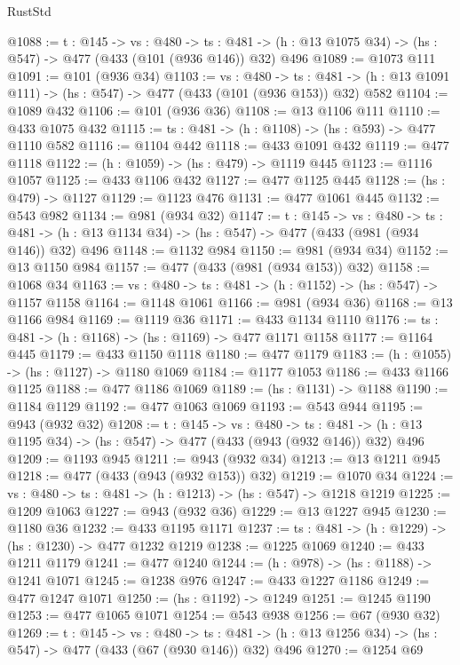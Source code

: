 \begin{lexlean}{RustStd}
\begin{coremodule}
@1088 := {t : @145} ->
  {vs : @480} ->
  {ts : @481} -> (h : @13 @1075 @34) -> (hs : @547) -> @477 (@433 (@101 (@936 @146)) @32) @496
@1089 := @1073 @111
@1091 := @101 (@936 @34)
@1103 := {vs : @480} ->
  {ts : @481} -> (h : @13 @1091 @111) -> (hs : @547) -> @477 (@433 (@101 (@936 @153)) @32) @582
@1104 := @1089 @432
@1106 := @101 (@936 @36)
@1108 := @13 @1106 @111
@1110 := @433 @1075 @432
@1115 := {ts : @481} -> (h : @1108) -> (hs : @593) -> @477 @1110 @582
@1116 := @1104 @442
@1118 := @433 @1091 @432
@1119 := @477 @1118
@1122 := (h : @1059) -> (hs : @479) -> @1119 @445
@1123 := @1116 @1057
@1125 := @433 @1106 @432
@1127 := @477 @1125 @445
@1128 := (hs : @479) -> @1127
@1129 := @1123 @476
@1131 := @477 @1061 @445
@1132 := @543 @982
@1134 := @981 (@934 @32)
@1147 := {t : @145} ->
  {vs : @480} ->
  {ts : @481} -> (h : @13 @1134 @34) -> (hs : @547) -> @477 (@433 (@981 (@934 @146)) @32) @496
@1148 := @1132 @984
@1150 := @981 (@934 @34)
@1152 := @13 @1150 @984
@1157 := @477 (@433 (@981 (@934 @153)) @32)
@1158 := @1068 @34
@1163 := {vs : @480} -> {ts : @481} -> (h : @1152) -> (hs : @547) -> @1157 @1158
@1164 := @1148 @1061
@1166 := @981 (@934 @36)
@1168 := @13 @1166 @984
@1169 := @1119 @36
@1171 := @433 @1134 @1110
@1176 := {ts : @481} -> (h : @1168) -> (hs : @1169) -> @477 @1171 @1158
@1177 := @1164 @445
@1179 := @433 @1150 @1118
@1180 := @477 @1179
@1183 := (h : @1055) -> (hs : @1127) -> @1180 @1069
@1184 := @1177 @1053
@1186 := @433 @1166 @1125
@1188 := @477 @1186 @1069
@1189 := (hs : @1131) -> @1188
@1190 := @1184 @1129
@1192 := @477 @1063 @1069
@1193 := @543 @944
@1195 := @943 (@932 @32)
@1208 := {t : @145} ->
  {vs : @480} ->
  {ts : @481} -> (h : @13 @1195 @34) -> (hs : @547) -> @477 (@433 (@943 (@932 @146)) @32) @496
@1209 := @1193 @945
@1211 := @943 (@932 @34)
@1213 := @13 @1211 @945
@1218 := @477 (@433 (@943 (@932 @153)) @32)
@1219 := @1070 @34
@1224 := {vs : @480} -> {ts : @481} -> (h : @1213) -> (hs : @547) -> @1218 @1219
@1225 := @1209 @1063
@1227 := @943 (@932 @36)
@1229 := @13 @1227 @945
@1230 := @1180 @36
@1232 := @433 @1195 @1171
@1237 := {ts : @481} -> (h : @1229) -> (hs : @1230) -> @477 @1232 @1219
@1238 := @1225 @1069
@1240 := @433 @1211 @1179
@1241 := @477 @1240
@1244 := (h : @978) -> (hs : @1188) -> @1241 @1071
@1245 := @1238 @976
@1247 := @433 @1227 @1186
@1249 := @477 @1247 @1071
@1250 := (hs : @1192) -> @1249
@1251 := @1245 @1190
@1253 := @477 @1065 @1071
@1254 := @543 @938
@1256 := @67 (@930 @32)
@1269 := {t : @145} ->
  {vs : @480} ->
  {ts : @481} -> (h : @13 @1256 @34) -> (hs : @547) -> @477 (@433 (@67 (@930 @146)) @32) @496
@1270 := @1254 @69

\end{coremodule}
\end{lexlean}
